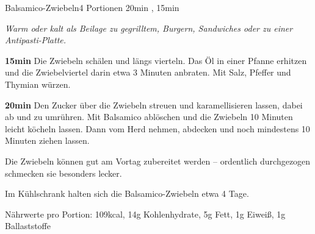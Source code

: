 \documentclass[../recipe-collections/cooking.tex]{subfiles}
\begin{document}
\begin{recipe}{Balsamico-Zwiebeln}{4 Portionen }{20min , 15min }

  \freeform{}\textit{Warm oder kalt als Beilage zu gegrilltem, Burgern, Sandwiches oder zu einer Antipasti-Platte.}


  \textbf{15min}
  Die Zwiebeln schälen und längs vierteln.
  Das Öl in einer Pfanne erhitzen und die Zwiebelviertel darin etwa 3 Minuten anbraten.
  Mit Salz, Pfeffer und Thymian würzen.


  \textbf{20min}
  Den Zucker über die Zwiebeln streuen und karamellisieren lassen, dabei ab und zu umrühren.
  Mit Balsamico ablöschen und die Zwiebeln 10 Minuten leicht köcheln lassen.
  Dann vom Herd nehmen, abdecken und noch mindestens 10 Minuten ziehen lassen.

  \freeform{}\hrulefill{}

  \freeform{}
  Die Zwiebeln können gut am Vortag zubereitet werden – ordentlich durchgezogen schmecken sie besonders lecker.

  \freeform{}
  Im Kühlschrank halten sich die Balsamico-Zwiebeln etwa 4 Tage.

  \freeform{}
  Nährwerte pro Portion: 109kcal, 14g Kohlenhydrate, 5g Fett, 1g Eiweiß, 1g Ballaststoffe

\end{recipe}
\end{document}
